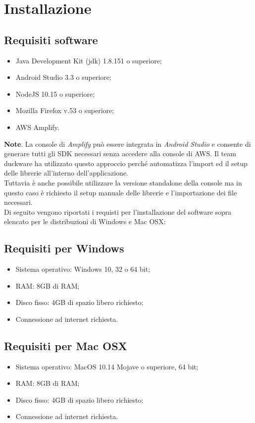 \pagebreak
\section{Installazione}
\label{sec:installazione}
\subsection{Requisiti software}
\begin{itemize}
    \item Java Development Kit (jdk) 1.8.151 o superiore;
    \item Android Studio 3.3 o superiore;
    \item NodeJS 10.15 o superiore;
    \item Mozilla Firefox v.53 o superiore;
    \item AWS Amplify.
\end{itemize}
\textbf{Note}. La console di \textit{Amplify} può essere integrata in \textit{Android Studio} e consente di generare tutti gli SDK necessari senza accedere alla console di AWS. Il team duckware ha utilizzato questo approccio perché automatizza l'import ed il setup delle librerie all'interno dell'applicazione.\\[0.25cm]
Tuttavia è anche possibile utilizzare la versione standalone della console ma in questo caso è richiesto il setup manuale delle librerie e l'importazione dei file necessari.\\[0.25cm]Di seguito vengono riportati i requisti per l'installazione del software sopra elencato per le distribuzioni di Windows e Mac OSX:
\subsection{Requisiti per Windows}
\begin{itemize}
    \item Sistema operativo: Windows 10, 32 o 64 bit;
    \item RAM: 8GB di RAM;
    \item Disco fisso: 4GB di spazio libero richiesto;
    \item Connessione ad internet richiesta.
\end{itemize}
\subsection{Requisiti per Mac OSX}
\begin{itemize}
    \item Sistema operativo: MacOS 10.14 Mojave o superiore, 64 bit;
    \item RAM: 8GB di RAM;
    \item Disco fisso: 4GB di spazio libero richiesto;
    \item Connessione ad internet richiesta.
\end{itemize}

